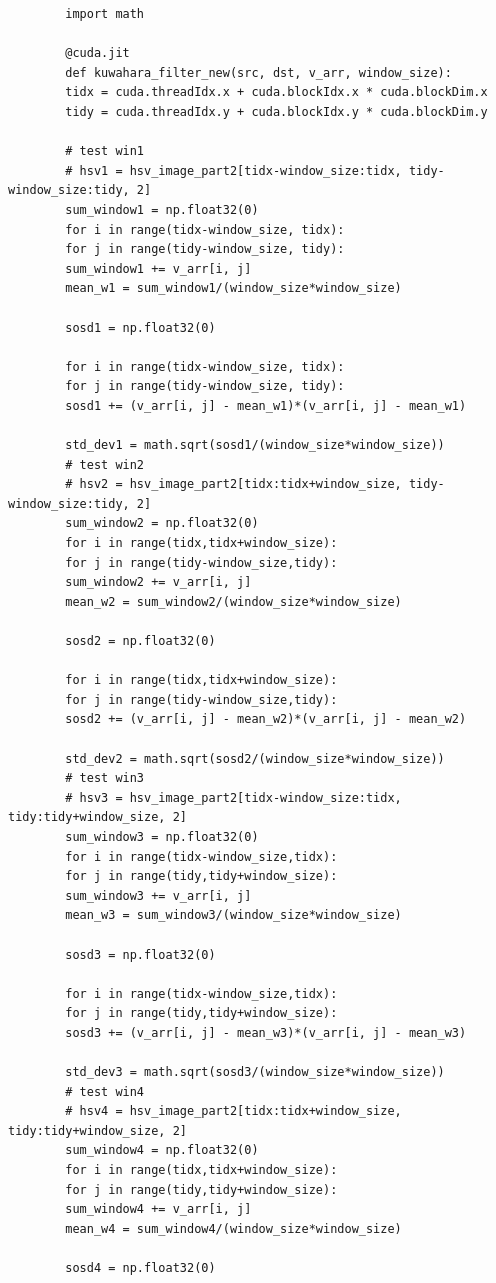 \documentclass{article}
\begin{document}
	\begin{verbatim}
		import math
		
		@cuda.jit
		def kuwahara_filter_new(src, dst, v_arr, window_size):
		tidx = cuda.threadIdx.x + cuda.blockIdx.x * cuda.blockDim.x
		tidy = cuda.threadIdx.y + cuda.blockIdx.y * cuda.blockDim.y
		
		# test win1
		# hsv1 = hsv_image_part2[tidx-window_size:tidx, tidy-window_size:tidy, 2]
		sum_window1 = np.float32(0)
		for i in range(tidx-window_size, tidx):
		for j in range(tidy-window_size, tidy):
		sum_window1 += v_arr[i, j]
		mean_w1 = sum_window1/(window_size*window_size)
		
		sosd1 = np.float32(0)
		
		for i in range(tidx-window_size, tidx):
		for j in range(tidy-window_size, tidy):
		sosd1 += (v_arr[i, j] - mean_w1)*(v_arr[i, j] - mean_w1)
		
		std_dev1 = math.sqrt(sosd1/(window_size*window_size))
		# test win2
		# hsv2 = hsv_image_part2[tidx:tidx+window_size, tidy-window_size:tidy, 2]
		sum_window2 = np.float32(0)
		for i in range(tidx,tidx+window_size):
		for j in range(tidy-window_size,tidy):
		sum_window2 += v_arr[i, j]
		mean_w2 = sum_window2/(window_size*window_size)
		
		sosd2 = np.float32(0)
		
		for i in range(tidx,tidx+window_size):
		for j in range(tidy-window_size,tidy):
		sosd2 += (v_arr[i, j] - mean_w2)*(v_arr[i, j] - mean_w2)
		
		std_dev2 = math.sqrt(sosd2/(window_size*window_size))
		# test win3
		# hsv3 = hsv_image_part2[tidx-window_size:tidx, tidy:tidy+window_size, 2]
		sum_window3 = np.float32(0)
		for i in range(tidx-window_size,tidx):
		for j in range(tidy,tidy+window_size):
		sum_window3 += v_arr[i, j]
		mean_w3 = sum_window3/(window_size*window_size)
		
		sosd3 = np.float32(0)
		
		for i in range(tidx-window_size,tidx):
		for j in range(tidy,tidy+window_size):
		sosd3 += (v_arr[i, j] - mean_w3)*(v_arr[i, j] - mean_w3)
		
		std_dev3 = math.sqrt(sosd3/(window_size*window_size))
		# test win4
		# hsv4 = hsv_image_part2[tidx:tidx+window_size, tidy:tidy+window_size, 2]
		sum_window4 = np.float32(0)
		for i in range(tidx,tidx+window_size):
		for j in range(tidy,tidy+window_size):
		sum_window4 += v_arr[i, j]
		mean_w4 = sum_window4/(window_size*window_size)
		
		sosd4 = np.float32(0)
		

\end{verbatim}
\end{document}
